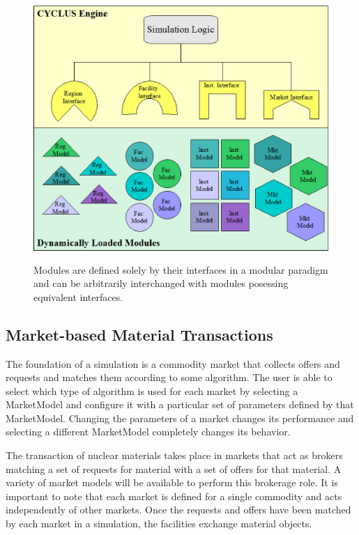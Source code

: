 \begin{figure}[htbp!]
  \begin{center}
    \includegraphics[height=10cm]{./chapters/paradigm/modularity.eps}
  \end{center}
  \caption{Modules are defined solely by their interfaces in a modular 
  paradigm and can be arbitrarily interchanged with modules posessing 
  equivalent interfaces.}
  \label{fig:modularity}
\end{figure}

\subsection{Market-based Material Transactions}

The foundation of a simulation is a commodity market that collects 
offers and requests and matches them according to some algorithm.  The 
user is able to select which type of algorithm is used for each market 
by selecting a MarketModel and configure it with a particular set of 
parameters defined by that MarketModel.  Changing the parameters of a 
market changes its performance and selecting a different MarketModel 
completely changes its behavior.

The transaction of nuclear materials takes place in markets that act
as brokers matching a set of requests for material with a set of
offers for that material. A variety of market models will be available
to perform this brokerage role. It is important to note that each
market is defined for a single commodity and acts independently of
other markets. Once the requests and offers have been matched by each
market in a simulation, the facilities exchange material objects.

